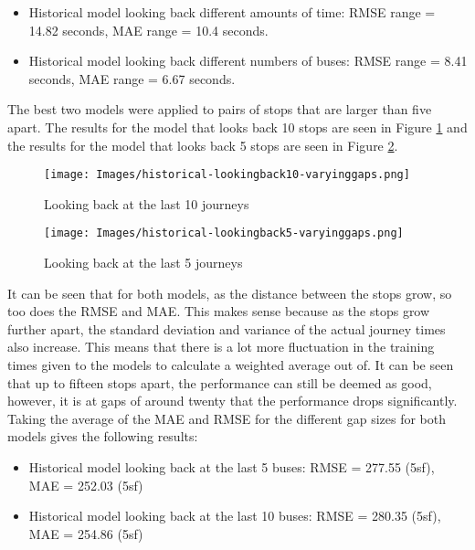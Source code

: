 \begin{itemize}
    \item Historical model looking back different amounts of time: RMSE range = 14.82 seconds, MAE range = 10.4 seconds.
    \item Historical model looking back different numbers of buses: RMSE range = 8.41 seconds, MAE range = 6.67 seconds.
\end{itemize}

The best two models were applied to pairs of stops that are larger than five apart. The results for the model that looks back 10 stops are seen in Figure \ref{fig:historical-allgals-lookback10} and the results for the model that looks back 5 stops are seen in Figure \ref{fig:historical-allgaps-lookback5}. 

\begin{figure}[H]
\begin{center}
    \texttt{[image: Images/historical-lookingback10-varyinggaps.png]}
    \caption{Looking back at the last 10 journeys}
    \label{fig:historical-allgals-lookback10}
\end{center}
\end{figure}

\begin{figure}[H]
\begin{center}
    \texttt{[image: Images/historical-lookingback5-varyinggaps.png]}
    \caption{Looking back at the last 5 journeys}
    \label{fig:historical-allgaps-lookback5}
\end{center}
\end{figure}

It can be seen that for both models, as the distance between the stops grow, so too does the RMSE and MAE. This makes sense because as the stops grow further apart, the standard deviation and variance of the actual journey times also increase. This means that there is a lot more fluctuation in the training times given to the models to calculate a weighted average out of. It can be seen that up to fifteen stops apart, the performance can still be deemed as good, however, it is at gaps of around twenty that the performance drops significantly.  \\

Taking the average of the MAE and RMSE for the different gap sizes for both models gives the following results: 

\begin{itemize}
    \item Historical model looking back at the last 5 buses: RMSE = 277.55 (5sf), MAE = 252.03 (5sf)
    \item Historical model looking back at the last 10 buses: RMSE = 280.35 (5sf), MAE = 254.86 (5sf)
\end{itemize}

